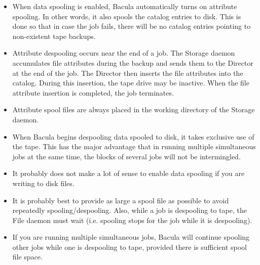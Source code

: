 \begin{itemize}
\item When data spooling is enabled, Bacula automatically  turns on attribute
   spooling. In other words, it also  spools the catalog entries to disk. This is
   done so  that in case the job fails, there will be no catalog  entries
   pointing to non-existent tape backups. 
\item Attribute despooling occurs near the end of a job.  The Storage daemon
   accumulates file attributes during the backup and  sends them to the
   Director at the end of the job.  The Director then inserts the file
   attributes into the catalog.  During this insertion, the tape drive may
   be inactive.  When the file attribute insertion is completed, the job
   terminates. 
\item Attribute spool files are always placed in the  working directory of 
   the Storage daemon.
\item When Bacula begins despooling data spooled to disk, it  takes exclusive
   use of the tape. This has the major  advantage that in running multiple
   simultaneous jobs at  the same time, the blocks of several jobs will not be 
   intermingled. 
\item It probably does not make a lot of sense to enable data  spooling if you
   are writing to disk files. 
\item It is probably best to provide as large a spool file as  possible to
   avoid repeatedly spooling/despooling. Also,  while a job is despooling to
   tape, the File daemon must wait  (i.e. spooling stops for the job while it is 
   despooling).  
\item If you are running multiple simultaneous jobs, Bacula  will continue
   spooling other jobs while one is despooling  to tape, provided there is
   sufficient spool file space. 
\end{itemize}
